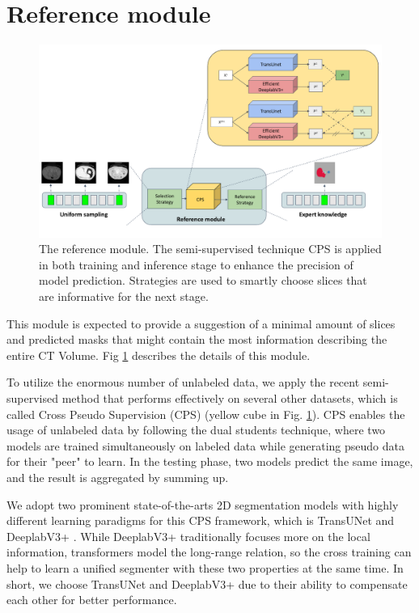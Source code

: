 \section{Reference module}
\label{sec:reference}
\begin{figure}[!htb]
    \centering
    \includegraphics[width=\textwidth]{content/resources/new_images/reference.pdf}
    \caption{The reference module. The semi-supervised technique CPS is applied in both training and inference stage to enhance the precision of model prediction. Strategies are used to smartly choose slices that are informative for the next stage. }
    \label{fig:reference}
\end{figure}


This module is expected to provide a suggestion of a minimal amount of slices and predicted masks that might contain the most information describing the entire CT Volume. Fig \ref{fig:reference} describes the details of this module.

To utilize the enormous number of unlabeled data, we apply the recent semi-supervised method that performs effectively on several other datasets, which is called Cross Pseudo Supervision (CPS) \cite{cps21chen} (yellow cube in Fig. \ref{fig:reference}).
CPS enables the usage of unlabeled data by following the dual students technique, where two models are trained simultaneously on labeled data while generating pseudo data for their "peer" to learn. In the testing phase, two models predict the same image, and the result is aggregated by summing up.

We adopt two prominent state-of-the-arts 2D segmentation models with highly different learning paradigms for this CPS framework, which is TransUNet \cite{transunet21chen} and DeeplabV3+ \cite{dlv3p18chen}. While DeeplabV3+ traditionally focuses more on the local information, transformers model the long-range relation, so the cross training can help to learn a unified segmenter with these two properties at the same time. In short, we choose TransUNet and DeeplabV3+ due to their ability to compensate each other for better performance. \cite{crosscnntransformer21luo}


